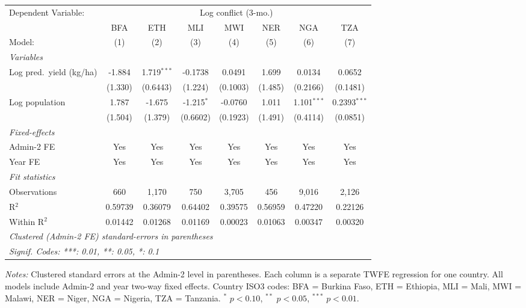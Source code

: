 
\begingroup
\centering
\begin{tabular}{lccccccc}
   \tabularnewline \midrule \midrule
   Dependent Variable: & \multicolumn{7}{c}{Log conflict (3-mo.)}\\
                             & BFA     & ETH           & MLI          & MWI      & NER     & NGA           & TZA \\   
   Model:                    & (1)     & (2)           & (3)          & (4)      & (5)     & (6)           & (7)\\  
   \midrule
   \emph{Variables}\\
   Log pred.\ yield (kg/ha)  & -1.884  & 1.719$^{***}$ & -0.1738      & 0.0491   & 1.699   & 0.0134        & 0.0652\\   
                             & (1.330) & (0.6443)      & (1.224)      & (0.1003) & (1.485) & (0.2166)      & (0.1481)\\   
   Log population            & 1.787   & -1.675        & -1.215$^{*}$ & -0.0760  & 1.011   & 1.101$^{***}$ & 0.2393$^{***}$\\   
                             & (1.504) & (1.379)       & (0.6602)     & (0.1923) & (1.491) & (0.4114)      & (0.0851)\\   
   \midrule
   \emph{Fixed-effects}\\
   Admin-2 FE                & Yes     & Yes           & Yes          & Yes      & Yes     & Yes           & Yes\\  
   Year FE                   & Yes     & Yes           & Yes          & Yes      & Yes     & Yes           & Yes\\  
   \midrule
   \emph{Fit statistics}\\
   Observations              & 660     & 1,170         & 750          & 3,705    & 456     & 9,016         & 2,126\\  
   R$^2$                     & 0.59739 & 0.36079       & 0.64402      & 0.39575  & 0.56959 & 0.47220       & 0.22126\\  
   Within R$^2$              & 0.01442 & 0.01268       & 0.01169      & 0.00023  & 0.01063 & 0.00347       & 0.00320\\  
   \midrule \midrule
   \multicolumn{8}{l}{\emph{Clustered (Admin-2 FE) standard-errors in parentheses}}\\
   \multicolumn{8}{l}{\emph{Signif. Codes: ***: 0.01, **: 0.05, *: 0.1}}\\
\end{tabular}
 
\par \raggedright 
\textit{Notes:} Clustered standard errors at the Admin-2 level in parentheses. Each column is a separate TWFE regression for one country. All models include Admin-2 and year two-way fixed effects. Country ISO3 codes: BFA = Burkina Faso, ETH = Ethiopia, MLI = Mali, MWI = Malawi, NER = Niger, NGA = Nigeria, TZA = Tanzania. $^{*}$ $p<0.10$, $^{**}$ $p<0.05$, $^{***}$ $p<0.01$.
\par\endgroup


